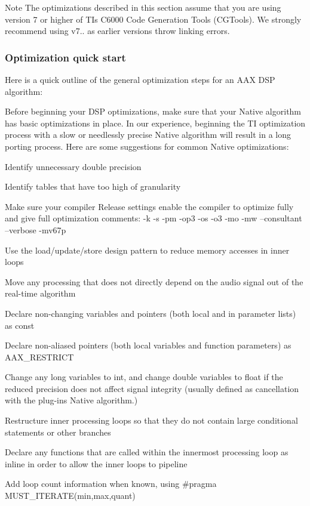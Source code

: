 \begin{DoxyNote}{Note}
The optimizations described in this section assume that you are using version 7 or higher of T\+I\textquotesingle{}s C6000 Code Generation Tools (C\+G\+Tools). We strongly recommend using v7.. as earlier versions throw linking errors.
\end{DoxyNote}
\hypertarget{a00362_subsection__optimization_quick_start}{}\subsubsection{Optimization quick start}\label{a00362_subsection__optimization_quick_start}
Here is a quick outline of the general optimization steps for an A\+A\+X D\+S\+P algorithm\+: 
\begin{DoxyEnumerate}
\item Before beginning your D\+S\+P optimizations, make sure that your Native algorithm has basic optimizations in place. In our experience, beginning the T\+I optimization process with a slow or needlessly precise Native algorithm will result in a long porting process. Here are some suggestions for common Native optimizations\+: 
\begin{DoxyItemize}
\item Identify unnecessary double precision  
\item Identify tables that have too high of granularity  
\end{DoxyItemize}
\item Make sure your compiler Release settings enable the compiler to optimize fully and give full optimization comments\+:  {\ttfamily -\/k -\/s -\/pm -\/op3 -\/os -\/o3 -\/mo -\/mw –consultant –verbose -\/mv67p}  
\item Use the load/update/store design pattern to reduce memory accesses in inner loops  
\item Move any processing that does not directly depend on the audio signal out of the real-\/time algorithm  
\item Declare non-\/changing variables and pointers (both local and in parameter lists) as {\ttfamily const}  
\item Declare non-\/aliased pointers (both local variables and function parameters) as A\+A\+X\+\_\+\+R\+E\+S\+T\+R\+I\+C\+T  
\item Change any {\ttfamily long} variables to{\itshape  } {\ttfamily int}, and change {\ttfamily double} variables to {\ttfamily float} if the reduced precision does not affect signal integrity (usually defined as cancellation with the plug-\/in\textquotesingle{}s Native algorithm.)  
\item Restructure inner processing loops so that they do not contain large conditional statements or other branches  
\item Declare any functions that are called within the innermost processing loop as {\ttfamily inline} in order to allow the inner loops to pipeline  
\item Add loop count information when known, using {\ttfamily \#pragma M\+U\+S\+T\+\_\+\+I\+T\+E\+R\+A\+T\+E(min,max,quant)} 
\end{DoxyEnumerate}

